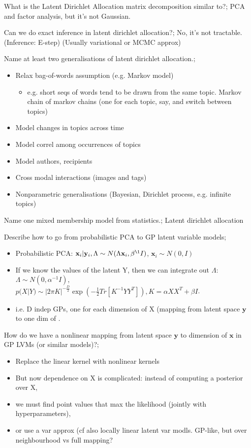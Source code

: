 \documentclass{article}
\begin{document}
What is the Latent Dirichlet Allocation matrix decomposition similar to?; PCA and factor analysis, but it's not Gaussian.

Can we do exact inference in latent dirichlet allocation?; No, it's not tractable. (Inference: E-step) (Usually variational or MCMC approx)

Name at least two generalisations of latent dirichlet allocation.; \begin{itemize}
    \item Relax bag-of-words assumption (e.g. Markov model) \begin{itemize}
        \item e.g. short seqs of words tend to be drawn from the same topic. Markov chain of markov chains (one for each topic, say, and switch between topics)
    \end{itemize}
    \item Model changes in topics across time
    \item Model correl among occurrences of topics
    \item Model authors, recipients
    \item Cross modal interactions (images and tags)
    \item Nonparametric generalisations (Bayesian, Dirichlet process, e.g. infinite topics)
\end{itemize}

Name one mixed membership model from statistics.; Latent dirichlet allocation




Describe how to go from probabilistic PCA to GP latent variable models; \begin{itemize}
    \item Probabilistic PCA: $\mathbf{x}_i|\mathbf{y}_i, \Lambda \sim N(\Lambda\mathbf{x}_i, \beta^{\1}I)$, $\mathbf{x}_i\sim N(0, I)$
    \item If we know the values of the latent Y, then we can integrate out $\Lambda$: $\Lambda\sim N(0, \alpha^{-1}I)$, $p(X|Y)\sim |2\pi K|^{-\frac{D}{2}}\exp(-\frac{1}{2}Tr[K^{-1}YY^T]), K=\alpha XX^T+\beta I$.
    \item i.e. D indep GPs, one for each dimension of X (mapping from latent space $\mathbf{y}$ to one dim of .
\end{itemize}

How do we have a nonlinear mapping from latent space $\mathbf{y}$ to dimension of $\mathbf{x}$ in GP LVMs (or similar models)?; \begin{itemize}
    \item Replace the linear kernel with nonlinear kernels
    \item But now dependence on X is complicated: instead of computing a posterior over X, 
    \item we must find point values that max the likelihood (jointly with hyperparameters), 
    \item or use a var approx (cf also locally linear latent var modls. GP-like, but over neighbourhood vs full mapping?
\end{itemize}
\end{document}
